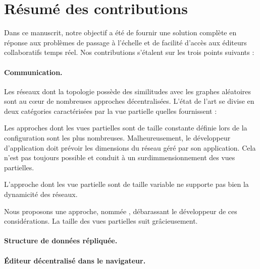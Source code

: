 
\section{Résumé des contributions}
\label{conclu:sec:summary}

Dans ce manuscrit, notre objectif a été de fournir une solution complète en
réponse aux problèmes de passage à l'échelle et de facilité d'accès aux éditeurs
collaboratifs temps réel. Nos contributions s'étalent sur les trois points
suivants : 

\paragraph{Communication.} Les réseaux dont la topologie possède des similitudes
avec les graphes aléatoires sont au cœur de nombreuses approches
décentralisées. L'état de l'art se divise en deux catégories caractérisées par
la vue partielle quelles fournissent :
\begin{inparaenum}[(i)]
\item Les approches dont les vues partielles sont de taille constante définie
  lors de la configuration sont les plus nombreuses. Malheureusement, le
  développeur d'application doit prévoir les dimensions du réseau géré par son
  application. Cela n'est pas toujours possible et conduit à un
  surdimmensionnement des vues partielles. 
\item L'approche dont les vue partielle sont de taille variable ne supporte pas
  bien la dynamicité des réseaux. 
\end{inparaenum}
Nous proposons une approche, nommée \SPRAY, débarassant le développeur de ces
considérations. La taille des vues partielles suit grâcieusement.


\paragraph{Structure de données répliquée.}

\paragraph{Éditeur décentralisé dans le navigateur.}

